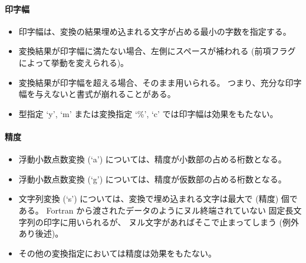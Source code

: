 \paragraph{印字幅}
\begin{itemize}
\item 印字幅は、変換の結果埋め込まれる文字が占める最小の字数を指定する。
\item 変換結果が印字幅に満たない場合、左側にスペースが補われる
(前項フラグによって挙動を変えられる)。
\item 変換結果が印字幅を超える場合、そのまま用いられる。
つまり、充分な印字幅を与えないと書式が崩れることがある。
\item 型指定 `y', `m' または変換指定 `\%', `c' では印字幅は効果をもたない。
\end{itemize}

\paragraph{精度}
\begin{itemize}
\item 浮動小数点数変換 (`a') については、精度が小数部の占める桁数となる。
\item 浮動小数点数変換 (`g') については、精度が仮数部の占める桁数となる。
\item 文字列変換 (`s') については、変換で埋め込まれる文字は最大で
(精度) 個である。
Fortran から渡されたデータのようにヌル終端されていない
固定長文字列の印字に用いられるが、
ヌル文字があればそこで止まってしまう (例外あり後述)。
\item その他の変換指定においては精度は効果をもたない。
\end{itemize}

